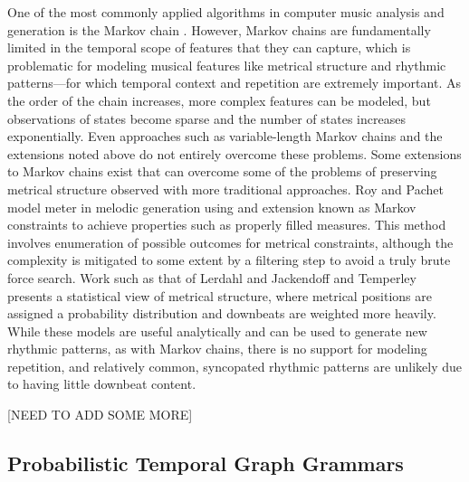 \documentclass{article}
\begin{document}
One of the most commonly applied algorithms in computer music analysis and generation is the Markov chain \cite{chordia2011, gillick2009, yi, pachet}. However, Markov chains are fundamentally limited in the temporal scope of features that they can capture, which is problematic for modeling musical features like metrical structure and rhythmic patterns---for which temporal context and repetition are extremely important. As the order of the chain increases, more complex features can be modeled, but observations of states become sparse and the number of states increases exponentially. Even approaches such as variable-length Markov chains \cite{ron, buhlmann} and the extensions noted above do not entirely overcome these problems. 
Some extensions to Markov chains exist that can overcome some of the problems of preserving metrical structure observed with more traditional approaches. Roy and Pachet model meter in melodic generation \cite{roy2013} using and extension known as Markov constraints \cite{pachet2011} to achieve properties such as properly filled measures. This method involves enumeration of possible outcomes for metrical constraints, although the complexity is mitigated to some extent by a filtering step to avoid a truly brute force search. 
Work such as that of Lerdahl and Jackendoff \cite{gttm} and Temperley \cite{temperley2010} presents a statistical view of metrical structure, where metrical positions are assigned a probability distribution and downbeats are weighted more heavily. While these models are useful analytically and can be used to generate new rhythmic patterns, as with Markov chains, there is no support for modeling repetition, and relatively common, syncopated rhythmic patterns are unlikely due to having little downbeat content. 

[NEED TO ADD SOME MORE]

\subsection{Probabilistic Temporal Graph Grammars}
\end{document}
